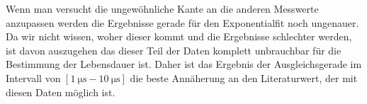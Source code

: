 Wenn man versucht die ungewöhnliche Kante an die anderen Messwerte anzupassen werden die Ergebnisse gerade für den Exponentialfit noch ungenauer. 
Da wir nicht wissen, woher dieser kommt und die Ergebnisse schlechter werden, 
ist davon auszugehen das dieser Teil der Daten komplett unbrauchbar für die Bestimmung der Lebensdauer ist.
Daher ist das Ergebnis der Ausgleichsgerade im Intervall von $[\qty{1}{\us}-\qty{10}{\us}]$ die beste Annäherung an den Literaturwert, der mit diesen Daten möglich ist. 

\newpage
\printbibliography

